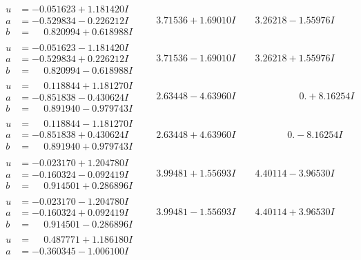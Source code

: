 \documentclass[1p]{elsarticle_modified}
\theoremstyle{definition}
\begin{document}
$$\begin{array}{c|c|c}
\begin{aligned}
u &= -0.051623 + 1.181420 I \\
a &= -0.529834 - 0.226212 I \\
b &= \phantom{-}0.820994 + 0.618988 I\end{aligned}
 & \phantom{-}3.71536 + 1.69010 I & \phantom{-}3.26218 - 1.55976 I \\ \hline\begin{aligned}
u &= -0.051623 - 1.181420 I \\
a &= -0.529834 + 0.226212 I \\
b &= \phantom{-}0.820994 - 0.618988 I\end{aligned}
 & \phantom{-}3.71536 - 1.69010 I & \phantom{-}3.26218 + 1.55976 I \\ \hline\begin{aligned}
u &= \phantom{-}0.118844 + 1.181270 I \\
a &= -0.851838 - 0.430624 I \\
b &= \phantom{-}0.891940 - 0.979743 I\end{aligned}
 & \phantom{-}2.63448 - 4.63960 I & \phantom{-0.000000 -}0. + 8.16254 I \\ \hline\begin{aligned}
u &= \phantom{-}0.118844 - 1.181270 I \\
a &= -0.851838 + 0.430624 I \\
b &= \phantom{-}0.891940 + 0.979743 I\end{aligned}
 & \phantom{-}2.63448 + 4.63960 I & \phantom{-0.000000 } 0. - 8.16254 I \\ \hline\begin{aligned}
u &= -0.023170 + 1.204780 I \\
a &= -0.160324 - 0.092419 I \\
b &= \phantom{-}0.914501 + 0.286896 I\end{aligned}
 & \phantom{-}3.99481 + 1.55693 I & \phantom{-}4.40114 - 3.96530 I \\ \hline\begin{aligned}
u &= -0.023170 - 1.204780 I \\
a &= -0.160324 + 0.092419 I \\
b &= \phantom{-}0.914501 - 0.286896 I\end{aligned}
 & \phantom{-}3.99481 - 1.55693 I & \phantom{-}4.40114 + 3.96530 I \\ \hline\begin{aligned}
u &= \phantom{-}0.487771 + 1.186180 I \\
a &= -0.360345 - 1.006100 I \\

\end{aligned}
\end{array}$$
\end{document}
